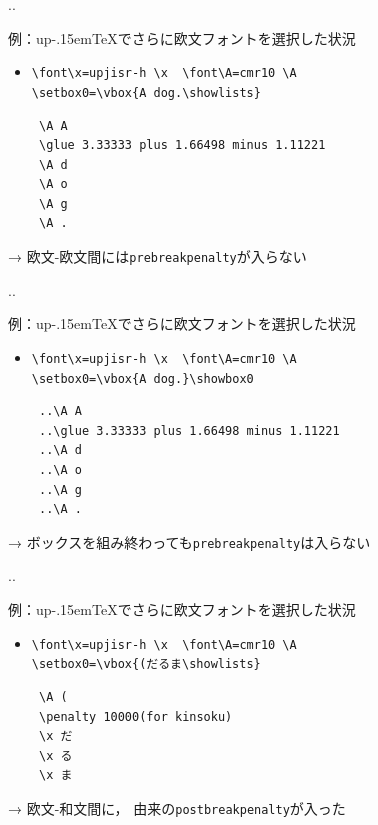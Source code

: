 \documentclass[a5paper,dvipdfmx,14pt]{beamer}
\def\cs#1{\texttt{\char92\nobreak#1}}
\def\pTeX{p\kern-.15em\TeX}
\def\upTeX{u\pTeX}
\begin{document}
\begin{frame}[t,fragile]{\insertsectionnumber.\insertsubsectionnumber. \insertsubsection}
{\footnotesize\def\verbnotesize{\scriptsize}
例：\upTeX でさらに欧文フォントを選択した状況
\begin{itemize}
  \item \verb+\font\x=upjisr-h \x  \font\A=cmr10 \A+\\
        \verb+\setbox0=\vbox{A dog.\showlists}+
\begin{verbnote}
\begin{verbatim}
 \A A
 \glue 3.33333 plus 1.66498 minus 1.11221
 \A d
 \A o
 \A g
 \A .
\end{verbatim}
\end{verbnote}
\end{itemize}\vskip-25pt
→ 欧文-欧文間には\cs{prebreakpenalty}が入らない
}
\end{frame}

\begin{frame}[t,fragile]{\insertsectionnumber.\insertsubsectionnumber. \insertsubsection}
{\footnotesize\def\verbnotesize{\scriptsize}
例：\upTeX でさらに欧文フォントを選択した状況
\begin{itemize}
  \item \verb+\font\x=upjisr-h \x  \font\A=cmr10 \A+\\
        \verb+\setbox0=\vbox{A dog.}\showbox0+
\begin{verbnote}
\begin{verbatim}
 ..\A A
 ..\glue 3.33333 plus 1.66498 minus 1.11221
 ..\A d
 ..\A o
 ..\A g
 ..\A .
\end{verbatim}
\end{verbnote}
\end{itemize}\vskip-25pt
→ ボックスを組み終わっても\cs{prebreakpenalty}は入らない
}
\end{frame}

\begin{frame}[t,fragile]{\insertsectionnumber.\insertsubsectionnumber. \insertsubsection}
{\footnotesize\def\verbnotesize{\scriptsize}
例：\upTeX でさらに欧文フォントを選択した状況
\begin{itemize}
  \item \verb+\font\x=upjisr-h \x  \font\A=cmr10 \A+\\
        \verb+\setbox0=\vbox{(だるま\showlists}+
\begin{verbnote}
\begin{verbatim}
 \A (
 \penalty 10000(for kinsoku)
 \x だ
 \x る
 \x ま
\end{verbatim}
\end{verbnote}
\end{itemize}\vskip-25pt
→ 欧文\codechar{(}-和文間に，
  \codechar{(}由来の\cs{postbreakpenalty}が入った
}
\end{frame}
\end{document}
